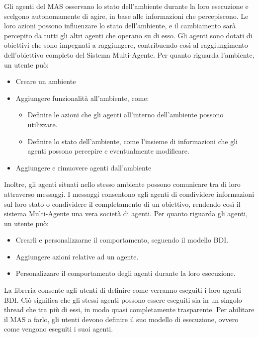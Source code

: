 Gli agenti del MAS osservano lo stato dell'ambiente durante la loro esecuzione e scelgono autonomamente di agire, in base alle informazioni che percepiscono. Le loro azioni possono influenzare lo stato dell'ambiente, e il cambiamento sarà percepito da tutti gli altri agenti che operano su di esso. Gli agenti sono dotati di obiettivi che sono impegnati a raggiungere, contribuendo così al raggiungimento dell'obiettivo completo del Sistema Multi-Agente. Per quanto riguarda l'ambiente, un utente può:

\begin{itemize}
    \item Creare un ambiente
    \item Aggiungere funzionalità all'ambiente, come:
    \begin{itemize}
        \item Definire le azioni che gli agenti all'interno dell'ambiente possono utilizzare.
        \item Definire lo stato dell'ambiente, come l'insieme di informazioni che gli agenti possono percepire e eventualmente modificare.
    \end{itemize}
    \item Aggiungere e rimuovere agenti dall'ambiente
\end{itemize}

Inoltre, gli agenti situati nello stesso ambiente possono comunicare tra di loro attraverso messaggi. I messaggi consentono agli agenti di condividere informazioni sul loro stato o condividere il completamento di un obiettivo, rendendo così il sistema Multi-Agente una vera società di agenti. Per quanto riguarda gli agenti, un utente può:

\begin{itemize}
    \item Crearli e personalizzarne il comportamento, seguendo il modello BDI.
    \item Aggiungere azioni relative ad un agente.
    \item Personalizzare il comportamento degli agenti durante la loro esecuzione.
\end{itemize}

La libreria consente agli utenti di definire come verranno eseguiti i loro agenti BDI. Ciò significa che gli stessi agenti possono essere eseguiti sia in un singolo thread che tra più di essi, in modo quasi completamente trasparente. Per abilitare il MAS a farlo, gli utenti devono definire il suo modello di esecuzione, ovvero come vengono eseguiti i suoi agenti.

